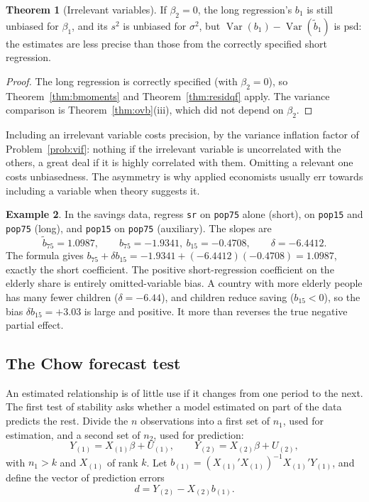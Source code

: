 \documentclass[11pt,a4paper]{article}
\numberwithin{equation}{section}
\DeclareMathOperator{\Var}{Var}
\theoremstyle{definition}
\newtheorem{thm}{Theorem}[subsection]
\newtheorem{exa}[thm]{Example}
\begin{document}
\begin{thm}[Irrelevant variables]
\label{thm:irrelevant}
If $\beta_2 = 0$, the long regression's $b_1$ is still unbiased for $\beta_1$, and its $s^2$ is unbiased for $\sigma^2$, but $\Var(b_1) - \Var(\tilde b_1)$ is psd: the
estimates are less precise than those from the correctly specified short regression.
\end{thm}

\begin{proof}
The long regression is correctly specified (with $\beta_2 = 0$), so Theorem~\ref{thm:bmoments} and Theorem~\ref{thm:residqf} apply. The variance comparison is
Theorem~\ref{thm:ovb}(iii), which did not depend on $\beta_2$.
\end{proof}

Including an irrelevant variable costs precision, by the variance inflation factor of Problem~\ref{prob:vif}: nothing if the irrelevant variable is
uncorrelated with the others, a great deal if it is highly correlated with them. Omitting a relevant one costs unbiasedness. The asymmetry is why
applied economists usually err towards including a variable when theory suggests it.

\begin{exa}
\label{ex:ovbsavings}
In the savings data, regress \texttt{sr} on \texttt{pop75} alone (short), on \texttt{pop15} and \texttt{pop75} (long), and \texttt{pop15} on \texttt{pop75}
(auxiliary). The slopes are
\[
\tilde b_{75} = 1.0987, \qquad b_{75} = -1.9341,\ b_{15} = -0.4708, \qquad \delta = -6.4412 .
\]
The formula gives $b_{75} + \delta b_{15} = -1.9341 + (-6.4412)(-0.4708) = 1.0987$, exactly the short coefficient. The positive short-regression coefficient
on the elderly share is entirely omitted-variable bias. A country with more elderly people has many fewer children ($\delta = -6.44$), and children reduce
saving ($b_{15} < 0$), so the bias $\delta b_{15} = +3.03$ is large and positive. It more than reverses the true negative partial effect.
\end{exa}

\subsection{The Chow forecast test}
\label{ssec:chowf}

An estimated relationship is of little use if it changes from one period to the next. The first test of stability asks whether a model estimated on
part of the data predicts the rest. Divide the $n$ observations into a first set of $n_1$, used for estimation, and a second set of $n_2$, used for
prediction:
\[
Y_{(1)} = X_{(1)}\beta + U_{(1)}, \qquad Y_{(2)} = X_{(2)}\beta + U_{(2)} ,
\]
with $n_1 > k$ and $X_{(1)}$ of rank $k$. Let $b_{(1)} = (X_{(1)}'X_{(1)})^{-1}X_{(1)}'Y_{(1)}$, and define the vector of prediction errors
\[
d = Y_{(2)} - X_{(2)}b_{(1)} .
\]
\end{document}
